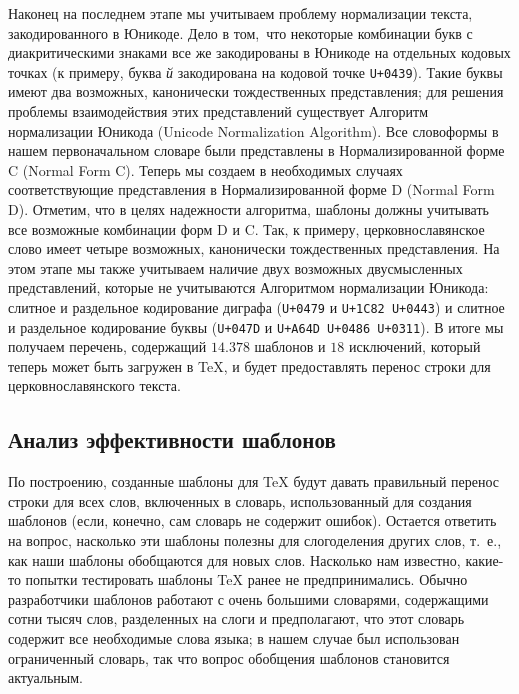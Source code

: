 \documentclass[12pt,a4paper,oneside]{extarticle}
\begin{document}
Наконец на последнем этапе мы учитываем проблему нормализации текста, закодированного в Юникоде. Дело в том, что некоторые комбинации букв с диакритическими знаками все же закодированы в Юникоде на отдельных кодовых точках (к примеру, буква \emph{й} закодирована на кодовой точке \verb!U+0439!). Такие буквы имеют два возможных, канонически тождественных представления; для решения проблемы взаимодействия этих представлений существует Алгоритм нормализации Юникода (\textenglish{Unicode Normalization Algorithm})\autocite[Подробности см. ][]{tr15}. Все словоформы в нашем первоначальном словаре были представлены в Нормализированной форме C (\textenglish{Normal Form C}). Теперь мы создаем в необходимых случаях соответствующие представления в Нормализированной форме D (\textenglish{Normal Form D}). Отметим, что в целях надежности алгоритма, шаблоны должны учитывать все возможные комбинации форм D и C. Так, к примеру, церковнославянское слово  имеет четыре возможных, канонически тождественных представления. На этом этапе мы также учитываем наличие двух возможных двусмысленных представлений, которые не учитываются Алгоритмом нормализации Юникода: слитное и раздельное кодирование диграфа  (\verb!U+0479! и \verb!U+1C82 U+0443!) и слитное и раздельное кодирование буквы  (\verb!U+047D! и \verb!U+A64D U+0486 U+0311!)\autocite[Специфику нормализации церковнославянского текста см. в работе ][]{utn41}. В итоге мы получаем перечень, содержащий $14.378$ шаблонов и $18$ исключений, который теперь может быть загружен в \TeX{}, и будет предоставлять перенос строки для церковнославянского текста.

\subsection{Анализ эффективности шаблонов}

По построению, созданные шаблоны для \TeX{} будут давать правильный перенос строки для всех слов, включенных в словарь, использованный для создания шаблонов (если, конечно, сам словарь не содержит ошибок). Остается ответить на вопрос, насколько эти шаблоны полезны для слогоделения других слов, т.~е., как наши шаблоны обобщаются для новых слов. Насколько нам известно, какие-то попытки тестировать шаблоны \TeX{} ранее не предпринимались. Обычно разработчики шаблонов работают с очень большими словарями, содержащими сотни тысяч слов, разделенных на слоги и предполагают, что этот словарь содержит все необходимые слова языка; в нашем случае был использован ограниченный словарь, так что вопрос обобщения шаблонов становится актуальным.
\end{document}
